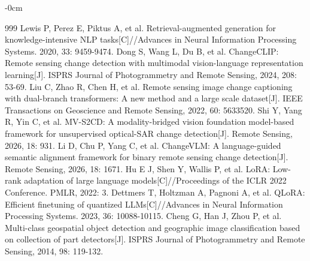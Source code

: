 \documentclass[applsci,article,accept,moreauthors]{Definitions/mdpi}
\begin{document}
\begin{adjustwidth}{-\extralength}{0cm}
\begin{thebibliography}{999}
Lewis P, Perez E, Piktus A, et al. Retrieval-augmented generation for knowledge-intensive NLP tasks[C]//Advances in Neural Information Processing Systems. 2020, 33: 9459-9474.
Dong S, Wang L, Du B, et al. ChangeCLIP: Remote sensing change detection with multimodal vision-language representation learning[J]. ISPRS Journal of Photogrammetry and Remote Sensing, 2024, 208: 53-69.
Liu C, Zhao R, Chen H, et al. Remote sensing image change captioning with dual-branch transformers: A new method and a large scale dataset[J]. IEEE Transactions on Geoscience and Remote Sensing, 2022, 60: 5633520.
Shi Y, Yang R, Yin C, et al. MV-S2CD: A modality-bridged vision foundation model-based framework for unsupervised optical-SAR change detection[J]. Remote Sensing, 2026, 18: 931.
Li D, Chu P, Yang C, et al. ChangeVLM: A language-guided semantic alignment framework for binary remote sensing change detection[J]. Remote Sensing, 2026, 18: 1671.
Hu E J, Shen Y, Wallis P, et al. LoRA: Low-rank adaptation of large language models[C]//Proceedings of the ICLR 2022 Conference. PMLR, 2022: 3.
Dettmers T, Holtzman A, Pagnoni A, et al. QLoRA: Efficient finetuning of quantized LLMs[C]//Advances in Neural Information Processing Systems. 2023, 36: 10088-10115.
Cheng G, Han J, Zhou P, et al. Multi-class geospatial object detection and geographic image classification based on collection of part detectors[J]. ISPRS Journal of Photogrammetry and Remote Sensing, 2014, 98: 119-132.

\end{thebibliography}

\PublishersNote{}
\end{adjustwidth}
\end{document}
